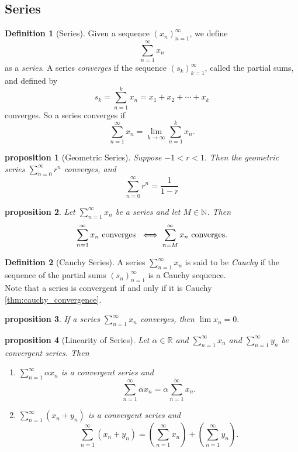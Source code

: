 \documentclass{article}
\newtheorem{proposition}{Proposition}[section]
\newtheorem{proposition}{proposition}[section]
\theoremstyle{definition}
\newtheorem{definition}{Definition}[section]
\theoremstyle{remark}
\begin{document}
\subsection{Series}

\begin{definition}[Series]\label{def:series}
Given a sequence $ (x_n)^\infty_{n=1}$, we define
\[
\sum_{n=1}^\infty{x_n}
\]
as a \textit{series}. A series \textit{converges} if the sequence $ (s_k)^\infty_{k=1}$, called the partial sums, and defined by
\[
s_k = \sum_{n = 1}^k{x_n} = x_1 + x_2 + \cdots + x_k
\]
converges. So a series converges if
\[
\sum_{n=1}^\infty{x_n} = \lim_{k \to \infty}{\sum_{n = 1}^k{x_n}}.
\]
\end{definition}





\begin{proposition}[Geometric Series]\label{prp:geo_series}
Suppose $ -1 < r < 1.$ Then the geometric series $ \sum_{n=0}^\infty{r^n}$ converges, and 
\[
\sum_{n=0}^\infty{r^n} = \frac{1}{1-r}
\]
\end{proposition}






\begin{proposition}
Let $\sum_{n=1}^\infty{x_n}$ be a series and let $M \in \mathbb{N}$. Then
\[
\sum_{n=1}^\infty{x_n} \textnormal{ converges } \iff \sum_{n=M}^\infty{x_n} \textnormal{ converges.}
\]
\end{proposition}


\begin{definition}[Cauchy Series]
A series $\sum_{n=1}^\infty{x_n}$ is said to be \textit{Cauchy} if the sequence of the partial sums $ (s_n)^\infty_{n=1}$ is a Cauchy sequence.\\
Note that a series is convergent if and only if it is Cauchy \ref{thm:cauchy_convergence}.
\end{definition}




\begin{proposition}
If a series $\sum_{n=1}^\infty{x_n}$ converges, then $\lim{x_n} = 0.$
\end{proposition}






\begin{proposition}[Linearity of Series]\label{prp:linearity_series}
Let $\alpha \in \mathbb{R}$ and $\sum_{n=1}^{\infty} x_n$ and $\sum_{n=1}^{\infty} y_n$ be convergent series. Then
\begin{enumerate}
\item $\sum_{n=1}^{\infty} \alpha x_n$ is a convergent series and
\[
\sum_{n=1}^{\infty} \alpha x_n = \alpha \sum_{n=1}^{\infty} x_n.
\]
\item $\sum_{n=1}^{\infty} (x_n + y_n)$ is a convergent series and
\[
\sum_{n=1}^{\infty} (x_n + y_n) = \left( \sum_{n=1}^{\infty} x_n \right) + \left( \sum_{n=1}^{\infty} y_n \right).
\]
\end{enumerate}

\end{proposition}
\end{document}
